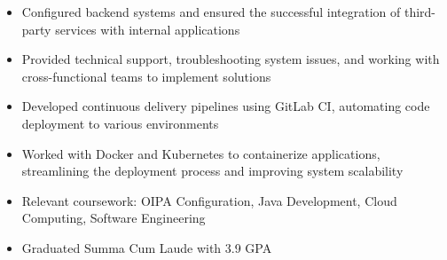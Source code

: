 \par\smallskip
\begin{minipage}{13.75cm}
  \begin{minipage}{6.5cm}
    \begin{itemize}
      \item Configured backend systems and ensured the successful integration of third-party services with internal applications
      \item Provided technical support, troubleshooting system issues, and working with cross-functional teams to implement solutions
    \end{itemize}
  \end{minipage}
  \hfill
  \begin{minipage}{6.5cm}
    \begin{itemize}
      \item Developed continuous delivery pipelines using GitLab CI, automating code deployment to various environments
      \item Worked with Docker and Kubernetes to containerize applications, streamlining the deployment process and improving system scalability
    \end{itemize}
  \end{minipage}
\end{minipage}

\par\bigskip
{}
\begin{itemize}
  \item Relevant coursework: OIPA Configuration, Java Development, Cloud Computing, Software Engineering
\end{itemize}
\divider

\begin{itemize}
  \item Graduated Summa Cum Laude with 3.9 GPA
\end{itemize}


